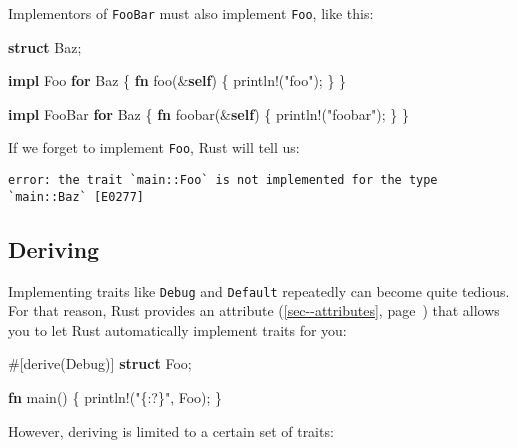 \documentclass[a4paper,]{book}
\renewcommand*{\hyperref}[2][\ar]{%
  \def\ar{#2}%
  #2 (\autoref{#1}, page~\pageref{#1})}
\newenvironment{Shaded}{\begin{snugshade}}{\end{snugshade}}
\newcommand{\KeywordTok}[1]{\textcolor[rgb]{0.13,0.29,0.53}{\textbf{{#1}}}}
\newcommand{\StringTok}[1]{\textcolor[rgb]{0.31,0.60,0.02}{{#1}}}
\newcommand{\OtherTok}[1]{\textcolor[rgb]{0.56,0.35,0.01}{{#1}}}
\newcommand{\NormalTok}[1]{{#1}}
\begin{document}
Implementors of \texttt{FooBar} must also implement \texttt{Foo}, like
this:

\begin{Shaded}
\begin{Highlighting}[]
\KeywordTok{struct} \NormalTok{Baz;}

\KeywordTok{impl} \NormalTok{Foo }\KeywordTok{for} \NormalTok{Baz \{}
    \KeywordTok{fn} \NormalTok{foo(&}\KeywordTok{self}\NormalTok{) \{ }\OtherTok{println!}\NormalTok{(}\StringTok{"foo"}\NormalTok{); \}}
\NormalTok{\}}

\KeywordTok{impl} \NormalTok{FooBar }\KeywordTok{for} \NormalTok{Baz \{}
    \KeywordTok{fn} \NormalTok{foobar(&}\KeywordTok{self}\NormalTok{) \{ }\OtherTok{println!}\NormalTok{(}\StringTok{"foobar"}\NormalTok{); \}}
\NormalTok{\}}
\end{Highlighting}
\end{Shaded}

If we forget to implement \texttt{Foo}, Rust will tell us:

\begin{verbatim}
error: the trait `main::Foo` is not implemented for the type `main::Baz` [E0277]
\end{verbatim}

\subsection{Deriving}\label{deriving}

Implementing traits like \texttt{Debug} and \texttt{Default} repeatedly
can become quite tedious. For that reason, Rust provides an
\hyperref[sec--attributes]{attribute} that allows you to let Rust
automatically implement traits for you:

\begin{Shaded}
\begin{Highlighting}[]
\OtherTok{#[}\NormalTok{derive}\OtherTok{(}\NormalTok{Debug}\OtherTok{)]}
\KeywordTok{struct} \NormalTok{Foo;}

\KeywordTok{fn} \NormalTok{main() \{}
    \OtherTok{println!}\NormalTok{(}\StringTok{"\{:?\}"}\NormalTok{, Foo);}
\NormalTok{\}}
\end{Highlighting}
\end{Shaded}

However, deriving is limited to a certain set of traits:
\end{document}
